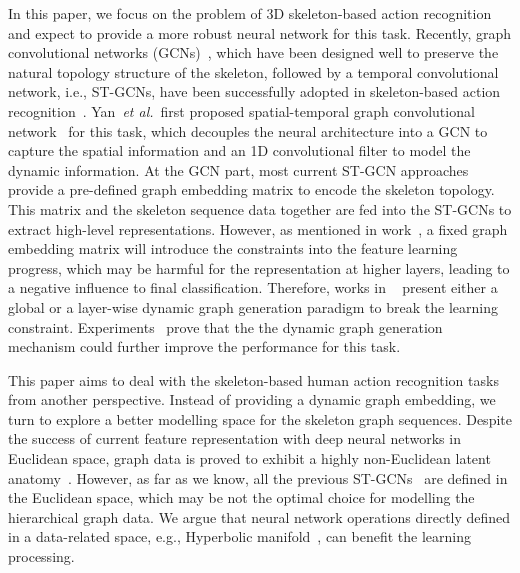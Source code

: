 \documentclass[letterpaper]{article} \usepackage{aaai19}  \usepackage{times}  \usepackage{helvet} \usepackage{courier}  \usepackage[hyphens]{url}  \usepackage{graphicx} \urlstyle{rm} \def\UrlFont{\rm}  \usepackage{graphicx}  \frenchspacing  \setlength{\pdfpagewidth}{8.5in}  \setlength{\pdfpageheight}{11in}
\def\etal{\emph{et al.}}
\begin{document}
In this paper, we focus on the problem of 3D skeleton-based action recognition and expect to provide a more robust neural network for this task. Recently, graph convolutional networks (GCNs)~\cite{defferrard2016convolutional,kipf2016semi}, which have been designed well to preserve the natural topology structure of the skeleton, followed by a temporal convolutional network, i.e., ST-GCNs, have been successfully adopted in skeleton-based action recognition~\cite{yan2018stgan,peng2020learning,shi2019two}. Yan~\etal ~first proposed spatial-temporal graph convolutional network~\cite{yan2018stgan} for this task, which decouples the neural architecture into a GCN to capture the spatial information and an 1D convolutional filter to model the dynamic information. At the GCN part, most current ST-GCN approaches provide a pre-defined graph embedding matrix to encode the skeleton topology. This matrix and the skeleton sequence data together are fed into the ST-GCNs to extract high-level representations. However, as mentioned in work~\cite{peng2020learning}, a fixed graph embedding matrix will introduce the constraints into the feature learning progress, which may be harmful for the representation at higher layers, leading to a negative influence to final classification. Therefore, works in ~\cite{shi2019two,peng2020learning} present either a global or a layer-wise dynamic graph generation paradigm to break the learning constraint. Experiments~\cite{shi2019two,peng2020learning} prove that the the dynamic graph generation mechanism could further improve the performance for this task. 

This paper aims to deal with the skeleton-based human action recognition tasks from another perspective. Instead of providing a dynamic graph embedding, we turn to explore a better modelling space for the skeleton graph sequences. Despite the success of current feature representation with deep neural networks in Euclidean space, graph data is proved to exhibit a highly non-Euclidean latent anatomy~\cite{bronstein2017geometric}. However, as far as we know, all the previous ST-GCNs~\cite{yan2018stgan,shi2019two,peng2020learning} are defined in the Euclidean space, which may be not the optimal choice for modelling the hierarchical graph data. We argue that neural network operations directly defined in a data-related space, e.g., Hyperbolic manifold~\cite{benedetti2012lectures}, can benefit the learning processing. 
\end{document}
